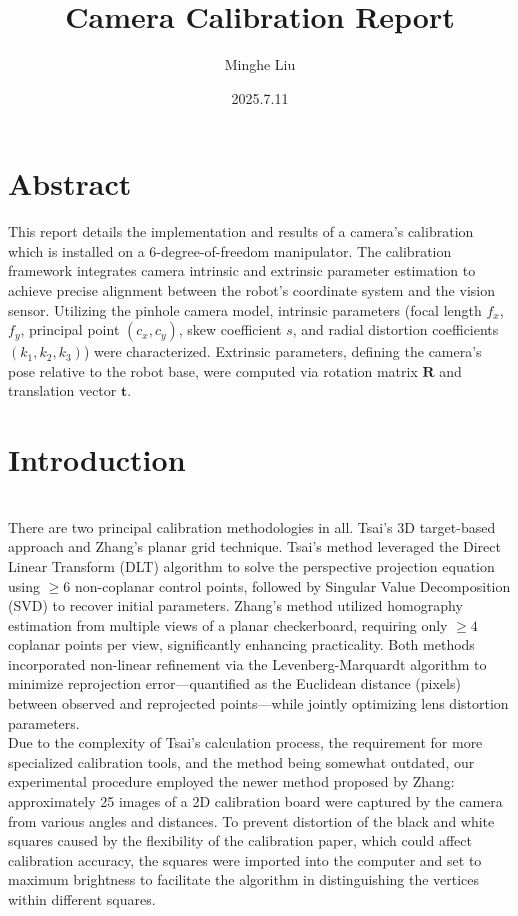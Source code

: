 \documentclass{article}
\title{Camera Calibration Report}
\author{Minghe Liu}
\date{2025.7.11}
\begin{document}
\maketitle

\section{Abstract}

\indent \indent This report details the implementation and results of a camera's calibration which is installed on a 6-degree-of-freedom manipulator. The calibration framework integrates camera intrinsic and extrinsic parameter estimation to achieve precise alignment between the robot’s coordinate system and the vision sensor. Utilizing the pinhole camera model, intrinsic parameters (focal length $f_x$, $f_y$, principal point $(c_x, c_y)$, skew coefficient $s$, and radial distortion coefficients $(k_1, k_2, k_3)$) were characterized. Extrinsic parameters, defining the camera’s pose relative to the robot base, were computed via rotation matrix $\mathbf{R}$ and translation vector $\mathbf{t}$.


\section{Introduction}\\

\indent \indent There are two principal calibration methodologies in all. Tsai's 3D target-based approach and Zhang's planar grid technique. Tsai's method leveraged the Direct Linear Transform (DLT) algorithm to solve the perspective projection equation using $\geq 6$ non-coplanar control points, followed by Singular Value Decomposition (SVD) to recover initial parameters. Zhang's method utilized homography estimation from multiple views of a planar checkerboard, requiring only $\geq 4$ coplanar points per view, significantly enhancing practicality. Both methods incorporated non-linear refinement via the Levenberg-Marquardt algorithm to minimize reprojection error—quantified as the Euclidean distance (pixels) between observed and reprojected points—while jointly optimizing lens distortion parameters.\\

\indent Due to the complexity of Tsai’s calculation process, the requirement for more specialized calibration tools, and the method being somewhat outdated, our experimental procedure employed the newer method proposed by Zhang: approximately 25 images of a 2D calibration board were captured by the camera from various angles and distances. To prevent distortion of the black and white squares caused by the flexibility of the calibration paper, which could affect calibration accuracy, the squares were imported into the computer and set to maximum brightness to facilitate the algorithm in distinguishing the vertices within different squares.
\end{document}
